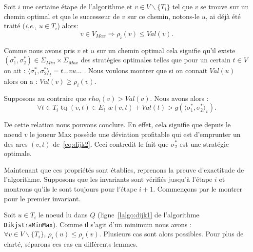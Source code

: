 \begin{propriete}
	\label{prop:dijk2}
	Soit $i$ une certaine étape de l'algorithme et $v \in V\backslash \{ T_i \}$ tel que $v$ se trouve sur un chemin optimal et que le successeur de $v$ sur ce chemin, notons-le $u$, ai déjà été traité (\emph{i.e.,} $u \in T_i$) alors:
	$$ v \in V_{Max} \Rightarrow \rho_i(v) \leq Val(v).$$
\end{propriete}

\begin{demonstration} 
	$\text{}$\\
	Comme nous avons pris $v$ et $u$ sur un chemin optimal cela signifie qu'il existe $(\sigma_1^*, \sigma_2^*) \in \Sigma_{Min} \times \Sigma_{Max}$ des stratégies optimales telles que pour un certain $t \in V$ on ait : $\langle \sigma_1^*, \sigma_2^* \rangle_t = t\ldots vu\ldots$ .
Nous voulons montrer que si on connait $Val(u)$ alors on a : $Val(v) \geq \rho_i(v)$.

Supposons au contraire que $ rho_i(v) > Val(v)$. Nous avons alors : 
\begin{equation} \forall t \in T_i \text{ tq } (v,t)\in E_i \,\, w(v,t) + Val(t) > g(\langle \sigma_1^*, \sigma_2^*\rangle_v). \label{eq:dijk2}\end{equation}

De cette relation nous pouvons conclure. En effet, cela signifie que depuis le noeud $v$ le joueur Max possède une déviation profitable qui est d'emprunter un des arcs $(v,t)$ de~\eqref{eq:dijk2}. Ceci contredit le fait que $\sigma_2^*$ est une stratégie optimale.
	
\end{demonstration}

Maintenant que ces propriétés sont établies, reprenons la preuve d'exactitude de l'algorithme. Supposons que les invariants sont vérifiés jusqu'à l'étape $i$ et montrons qu'ils le sont toujours pour l'étape $i+1$.
Commençons par le montrer pour le premier invariant.

Soit $u \in T_i$ le noeud lu dans $Q$ (ligne~\ref{lalgo:dijk1} de l'algorithme \verb|DikjstraMinMax|). Comme il s'agit d'un minimum nous avons : $\forall v \in V\backslash \{ T_i \},\, \rho_i(u) \leq \rho_i(v)$. Plusieurs cas sont alors possibles. Pour plus de clarté, séparons ces cas en différents lemmes.

